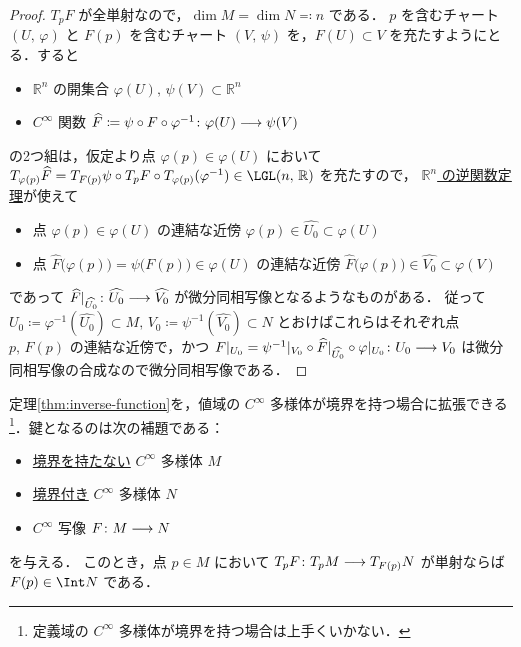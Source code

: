 \documentclass[geometry_main]{subfiles}
\begin{document}
\begin{proof}
    $T_p F$ が全単射なので，$\dim M = \dim N \eqqcolon n$ である．
    $p$ を含むチャート $(U,\, \varphi)$ と $F(p)$ を含むチャート $(V,\, \psi)$ を，$F(U) \subset V$ を充たすようにとる．すると
    \begin{itemize}
        \item $\mathbb{R}^n$ の開集合 $\varphi(U),\, \psi(V) \subset \mathbb{R}^n$
        \item $C^\infty$ 関数 $\widehat{F} \coloneqq \psi \circ F \circ \varphi^{-1} \colon \varphi(U) \longrightarrow \psi(V)$
    \end{itemize}
    の2つ組は，仮定より点 $\varphi(p) \in \varphi(U)$ において $T_{\varphi(p)} \widehat{F} = T_{F(p)} \psi \circ T_{p} F \circ T_{\varphi(p)} (\varphi^{-1}) \in \LGL(n,\, \mathbb{R})$ を充たすので，
    \hyperref[thm:inverse-function-Rn]{$\mathbb{R}^n$ の逆関数定理}が使えて
    \begin{itemize}
        \item 点 $\varphi(p) \in \varphi(U)$ の連結な近傍 $\varphi(p) \in \widehat{U_0} \subset \varphi(U)$
        \item 点 $\widehat{F}\bigl(\varphi(p)\bigr) = \psi \bigl( F(p) \bigr) \in \varphi(U)$ の連結な近傍 $\widehat{F}\bigl(\varphi(p)\bigr) \in \widehat{V_0} \subset \varphi(V)$
    \end{itemize}
    であって $\widehat{F}|_{\widehat{U_0}} \colon \widehat{U_0} \longrightarrow \widehat{V_0}$ が微分同相写像となるようなものがある．
    従って $U_0 \coloneqq \varphi^{-1} (\widehat{U_0}) \subset M,\, V_0 \coloneqq \psi^{-1}(\widehat{V_0}) \subset N$ とおけばこれらはそれぞれ点 $p,\, F(p)$ の連結な近傍で，かつ $F|_{U_0} = \psi^{-1}|_{V_0} \circ \widehat{F}|_{\widehat{U_0}} \circ \varphi|_{U_0} \colon U_0 \longrightarrow V_0$ は微分同相写像の合成なので微分同相写像である．
\end{proof}

定理\ref{thm:inverse-function}を，値域の $C^\infty$ 多様体が境界を持つ場合に拡張できる\footnote{定義域の $C^\infty$ 多様体が境界を持つ場合は上手くいかない．}．鍵となるのは次の補題である：

\begin{mylem}[label=lem:singular-b]{}
    \begin{itemize}
        \item \underline{境界を持たない} $C^\infty$ 多様体 $M$
        \item \underline{境界付き} $C^\infty$ 多様体 $N$
        \item $C^\infty$ 写像 $F \colon M \longrightarrow N$
    \end{itemize}
    を与える．
    このとき，点 $p \in M$ において $T_p F \colon T_p M \longrightarrow T_{F(p)} N$ が単射ならば $F(p) \in \Int N$ である．
\end{mylem}
\end{document}
